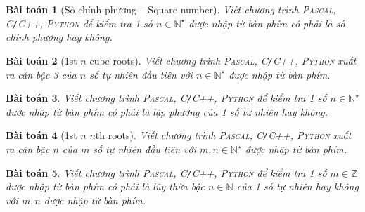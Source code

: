 \documentclass{article}
\newtheorem{baitoan}{Bài toán}
\begin{document}
\begin{baitoan}[Số chính phương -- Square number]
	Viết chương trình \textsc{Pascal, C\texttt{/}C++, Python} để kiểm tra 1 số $n\in\mathbb{N}^\star$ được nhập từ bàn phím có phải là số chính phương hay không.
\end{baitoan}

\begin{baitoan}[1st $n$ cube roots]
	Viết chương trình \textsc{Pascal, C\texttt{/}C++, Python} xuất ra căn bậc 3 của $n$ số tự nhiên đầu tiên với $n\in\mathbb{N}^\star$ được nhập từ bàn phím.
\end{baitoan}

\begin{baitoan}
	Viết chương trình \textsc{Pascal, C\texttt{/}C++, Python} để kiểm tra 1 số $n\in\mathbb{N}^\star$ được nhập từ bàn phím có phải là lập phương của 1 số tự nhiên hay không.
\end{baitoan}

\begin{baitoan}[1st $n$ $n$th roots]
	Viết chương trình \textsc{Pascal, C\texttt{/}C++, Python} xuất ra căn bậc $n$ của $m$ số tự nhiên đầu tiên với $m,n\in\mathbb{N}^\star$ được nhập từ bàn phím.
\end{baitoan}

\begin{baitoan}
	Viết chương trình \textsc{Pascal, C\texttt{/}C++, Python} để kiểm tra 1 số $m\in\mathbb{Z}$ được nhập từ bàn phím có phải là lũy thừa bậc $n\in\mathbb{N}$ của 1 số tự nhiên hay không với $m,n$ được nhập từ bàn phím.
\end{baitoan}
\end{document}
